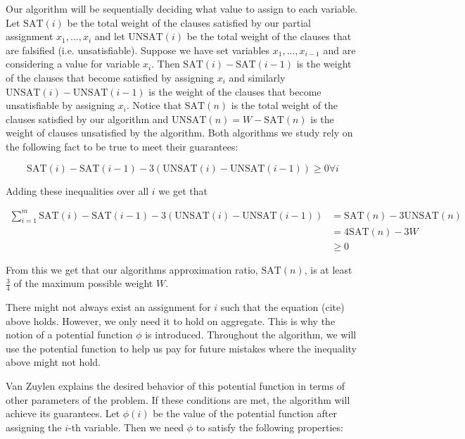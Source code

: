 \documentclass[11pt,letter]{article}
\begin{document}
Our algorithm will be sequentially deciding what value to assign to each variable. Let $\mathrm{SAT}(i)$ be the total weight of the clauses
satisfied by our partial assignment $x_1, ..., x_i$ and let $\mathrm{UNSAT}(i)$ be the total weight of the clauses that are falsified (i.e. unsatisfiable).
Suppose we have set variables $x_1,...,x_{i-1}$ and are considering a value for variable $x_i$. Then $\mathrm{SAT}(i)-\mathrm{SAT}(i-1)$ is the weight
of the clauses that become satisfied by assigning $x_i$ and similarly $\mathrm{UNSAT}(i) - \mathrm{UNSAT}(i-1)$ is the weight of the clauses that become
unsatisfiable by assigning $x_i$.
Notice that $\mathrm{SAT}(n)$ is the total weight of the clauses satisfied by our algorithm and $\mathrm{UNSAT}(n) = W - \mathrm{SAT}(n)$ is the weight of clauses
unsatisfied by the algorithm. Both algorithms we study rely on the following fact to be true to meet their guarantees:

\begin{equation}
\label{eq:1}
\mathrm{SAT}(i)-\mathrm{SAT}(i-1) - 3\left(\mathrm{UNSAT}(i) - \mathrm{UNSAT}(i-1)\right) \geq 0 \forall i
\end{equation}

Adding these inequalities over all $i$ we get that

\begin{equation*}
\begin{aligned}
\sum_{i = 1}^{m} \mathrm{SAT}(i)-\mathrm{SAT}(i-1) - 3\left(\mathrm{UNSAT}(i) - \mathrm{UNSAT}(i-1)\right)  & = \mathrm{SAT}(n) - 3\mathrm{UNSAT}(n) \\
& = 4\mathrm{SAT}(n) - 3W \\
& \geq 0
\end{aligned}
\end{equation*}

From this we get that our algorithms approximation ratio, $\mathrm{SAT}(n)$, is at least $\frac{3}{4}$ of the maximum possible weight $W$.

There might not always exist an assignment for $i$ such that the equation (cite) above holds. However, we only need it to hold on aggregate.
This is why the notion of a potential function $\phi$ is introduced. Throughout the algorithm, we will use the potential function to help us pay
for future mistakes where the inequality above might not hold.

Van Zuylen explains the desired behavior of this potential function in terms of other parameters of the problem. If these conditions are met, the algorithm
will achieve its guarantees. Let $\phi(i)$ be the value of the potential function after assigning the $i$-th variable. Then we need $\phi$ to satisfy the following properties:
\end{document}
